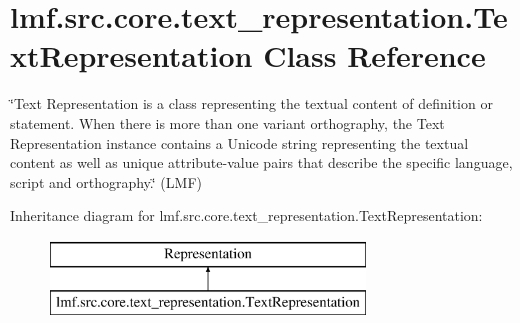 \hypertarget{classlmf_1_1src_1_1core_1_1text__representation_1_1_text_representation}{\section{lmf.\+src.\+core.\+text\+\_\+representation.\+Text\+Representation Class Reference}
\label{classlmf_1_1src_1_1core_1_1text__representation_1_1_text_representation}
}


\char`\"{}\+Text Representation is a class representing the textual content of definition or statement. When there is more than one variant orthography, the Text Representation instance contains a Unicode string representing the textual content as well as unique attribute-\/value pairs that describe the specific language, script and orthography.\char`\"{} (L\+M\+F)  


Inheritance diagram for lmf.\+src.\+core.\+text\+\_\+representation.\+Text\+Representation\+:\begin{figure}[H]
\begin{center}
\leavevmode
\includegraphics[height=2.000000cm]{classlmf_1_1src_1_1core_1_1text__representation_1_1_text_representation}
\end{center}
\end{figure}
